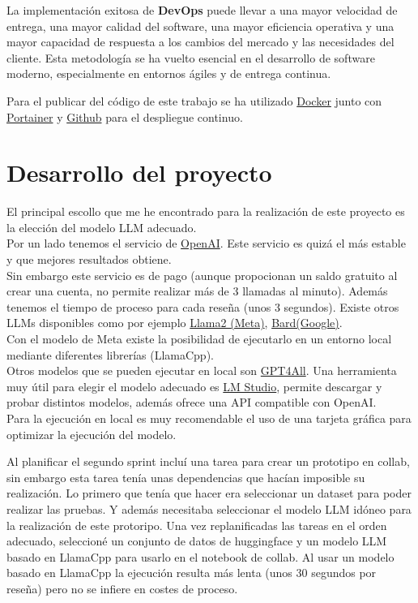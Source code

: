 La implementación exitosa de \textbf{DevOps} puede llevar a una mayor velocidad de entrega, 
una mayor calidad del software, una mayor eficiencia operativa y 
una mayor capacidad de respuesta a los cambios del mercado y las necesidades del cliente. 
Esta metodología se ha vuelto esencial en el desarrollo de software moderno, 
especialmente en entornos ágiles y de entrega continua.

Para el publicar del código de este trabajo se ha utilizado \href{https://www.docker.com/}{Docker} 
junto con \href{https://www.portainer.io/}{Portainer}  y \href{https:\\www.github.com}{Github} para el 
despliegue continuo.


\section{Desarrollo del proyecto}

El principal escollo que me he encontrado para la realización de este proyecto es la elección del modelo
LLM adecuado. \\
Por un lado tenemos el servicio de \href{https://openai.com}{OpenAI}. Este servicio es quizá el más estable y que 
mejores resultados obtiene.\\ 
Sin embargo este servicio es de pago (aunque propocionan un saldo gratuito al crear una cuenta, 
no permite realizar más de 3 llamadas al minuto).
Además tenemos el tiempo de proceso para cada reseña (unos 3 segundos).
Existe otros LLMs disponibles como por ejemplo \href{https://ai.meta.com/}{Llama2 (Meta)}, 
\href{https://bard.google.com/chat}{Bard(Google)}.\\
Con el modelo de Meta existe la posibilidad de ejecutarlo en un entorno local mediante 
diferentes librerías (LlamaCpp).\\
Otros modelos que se pueden ejecutar en local son \href{https://gpt4all.io/index.html}{GPT4All}.
Una herramienta muy útil para elegir el modelo adecuado es \href{https://lmstudio.ai/}{LM Studio}, permite descargar y probar distintos modelos,
además ofrece una API compatible con OpenAI.\\
Para la ejecución en local es muy recomendable el uso de una tarjeta gráfica 
para optimizar la ejecución del modelo.

Al planificar el segundo sprint incluí una tarea para crear un prototipo en collab, 
sin embargo esta tarea tenía unas dependencias que hacían imposible su realización.
Lo primero que tenía que hacer era seleccionar un dataset para poder realizar las pruebas.
Y además necesitaba seleccionar el modelo LLM idóneo para la realización de este protoripo.
Una vez replanificadas las tareas en el orden adecuado, seleccioné un conjunto de datos de huggingface y 
un modelo LLM basado en LlamaCpp para usarlo en el notebook de collab.
Al usar un modelo basado en LlamaCpp la ejecución resulta más lenta (unos 30 segundos por reseña) 
pero no se infiere en costes de proceso.


